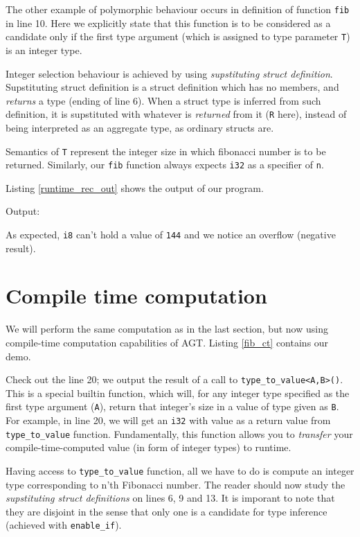 \documentclass[times, utf8, diplomski]{fer}
\theoremstyle{definition}
\newcommand{\textcode}[3]{
    
}
\begin{document}
The other example of polymorphic behaviour occurs in definition of function \texttt{fib} in line 10.
Here we explicitly state that this function is to be considered as a candidate only if
the first type argument (which is assigned to type parameter \texttt{T}) is an integer type.

Integer selection behaviour is achieved by using \textit{supstituting struct definition}.
Supstituting struct definition is a struct definition which has no members,
and \textit{returns} a type (ending of line 6). When a struct type is inferred from such definition,
it is supstituted with whatever is \textit{returned} from it (\texttt{R} here), 
instead of being interpreted as an aggregate type, as ordinary structs are.

Semantics of \texttt{T} represent the integer size in which fibonacci number is to be returned.
Similarly, our \texttt{fib} function always expects \texttt{i32} as a specifier of \texttt{n}.

Listing \ref{runtime_rec_out} shows the output of our program.

Output:
\textcode{\resdir/programs/fib_runtime_recursion.out}{runtime_rec_out}{Fibonacci with recursion - output}

As expected, \texttt{i8} can't hold a value of \texttt{144} and we notice an overflow (negative result).


\section{Compile time computation}

We will perform the same computation as in the last section, but now using compile-time 
computation capabilities of AGT. Listing \ref{fib_ct} contains our demo.

\textcode{\resdir/programs/fib_compile_time.agt}{fib_ct}{Compile-time Fibonacci}

Check out the line 20; we output the result of a call to \texttt{type\_to\_value<A,B>()}.
This is a special builtin function, which will, for any integer type specified as the first 
type argument (\texttt{A}), return that integer's size in a value of type given as \texttt{B}.
For example, in line 20, we will get an \texttt{i32} with value  as a return value
from \texttt{type\_to\_value} function. Fundamentally, this function allows you to \textit{transfer}
your compile-time-computed value (in form of integer types) to runtime.

Having access to \texttt{type\_to\_value} function, all we have to do is compute an integer
type corresponding to n'th Fibonacci number. The reader should now study the \textit{supstituting
struct definitions} on lines 6, 9 and 13. It is imporant to note that they are disjoint in the sense
that only one is a candidate for type inference (achieved with \texttt{enable\_if}).
\end{document}
